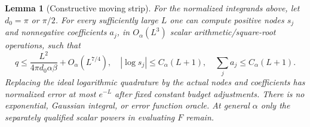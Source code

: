 \documentclass[11pt]{article}
\newtheorem{lemma}[theorem]{Lemma}
\numberwithin{equation}{section}
\begin{document}
\begin{lemma}[Constructive moving strip]\label{lem:constructive}
For the normalized integrands above, let $d_0=\pi$ or $\pi/2$.
For every sufficiently large $L$ one can compute positive nodes $s_j$
and nonnegative coefficients $a_j$, in $O_\alpha(L^3)$ scalar
arithmetic/square-root operations, such that
\begin{equation}\label{eq:movingCount}
 q\le\frac{L^2}{4\pi d_0\alpha\beta}+O_\alpha(L^{7/4}),
 \quad |\log s_j|\le C_\alpha(L+1),\quad
 \sum_j a_j\le C_\alpha(L+1).
\end{equation}
Replacing the ideal logarithmic quadrature by the actual nodes and
coefficients has normalized error at most $e^{-L}$ after fixed
constant budget adjustments. There is no exponential, Gaussian integral,
or error function oracle. At general $\alpha$ only the separately
qualified scalar powers in evaluating $F$ remain.
\end{lemma}
\end{document}

